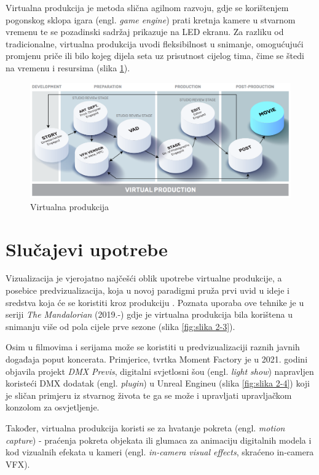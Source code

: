 \documentclass[times, utf8, zavrsni, numeric]{fer}
\begin{document}
Virtualna produkcija je metoda slična agilnom razvoju, gdje se korištenjem pogonskog sklopa igara (engl. \emph{game engine}) prati kretnja kamere u stvarnom vremenu te se pozadinski sadržaj prikazuje na LED ekranu. Za razliku od tradicionalne, virtualna produkcija uvodi fleksibilnost u snimanje, omogućujući promjenu priče ili bilo kojeg dijela seta uz prisutnost cijelog tima, čime se štedi na vremenu i resursima (slika \ref{fig:slika 2-2}).

\begin{figure}[htp]
	\centering
	\includegraphics[width=\linewidth]{slika 2-2.png}
	\caption{Virtualna produkcija \cite{vpguide1}}
	\label{fig:slika 2-2}
\end{figure}

\section{Slučajevi upotrebe}
Vizualizacija je vjerojatno najčešći oblik upotrebe virtualne produkcije, a posebice predvizualizacija, koja u novoj paradigmi pruža prvi uvid u ideje i sredstva koja će se koristiti kroz produkciju \cite{vpguide2}. Poznata uporaba ove tehnike je u seriji \emph{The Mandalorian} (2019.-) gdje je virtualna produkcija bila korištena u snimanju više od pola cijele prve sezone (slika \ref{fig:slika 2-3}).\newline

Osim u filmovima i serijama može se koristiti u predvizualizaciji raznih javnih događaja poput koncerata. Primjerice, tvrtka Moment Factory je u 2021. godini objavila projekt \emph{DMX Previs}, digitalni svjetlosni šou (engl. \emph{light show}) napravljen koristeći DMX dodatak (engl. \emph{plugin}) u Unreal Engineu (slika \ref{fig:slika 2-4}) koji je sličan primjeru iz stvarnog života te ga se može i upravljati upravljačkom konzolom za osvjetljenje.\newline

Također, virtualna produkcija koristi se za hvatanje pokreta (engl. \emph{motion capture}) - praćenja pokreta objekata ili glumaca za animaciju digitalnih modela i kod vizualnih efekata u kameri (engl. \emph{in-camera visual effects}, skraćeno in-camera VFX).
\end{document}
